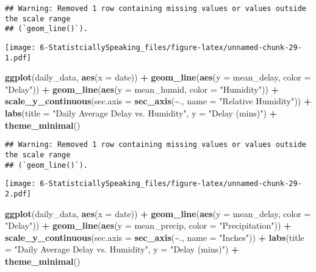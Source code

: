\documentclass[
]{article}
\newenvironment{Shaded}{\begin{snugshade}}{\end{snugshade}}
\newcommand{\AttributeTok}[1]{\textcolor[rgb]{0.13,0.29,0.53}{#1}}
\newcommand{\FunctionTok}[1]{\textcolor[rgb]{0.13,0.29,0.53}{\textbf{#1}}}
\newcommand{\NormalTok}[1]{#1}
\newcommand{\SpecialCharTok}[1]{\textcolor[rgb]{0.81,0.36,0.00}{\textbf{#1}}}
\newcommand{\StringTok}[1]{\textcolor[rgb]{0.31,0.60,0.02}{#1}}
\begin{document}
\begin{verbatim}
## Warning: Removed 1 row containing missing values or values outside the scale range
## (`geom_line()`).
\end{verbatim}

\texttt{[image: 6-StatistciallySpeaking\_files/figure-latex/unnamed-chunk-29-1.pdf]}

\begin{Shaded}
\begin{Highlighting}[]
\FunctionTok{ggplot}\NormalTok{(daily\_data, }\FunctionTok{aes}\NormalTok{(}\AttributeTok{x =}\NormalTok{ date)) }\SpecialCharTok{+}
  \FunctionTok{geom\_line}\NormalTok{(}\FunctionTok{aes}\NormalTok{(}\AttributeTok{y =}\NormalTok{ mean\_delay, }\AttributeTok{color =} \StringTok{"Delay"}\NormalTok{)) }\SpecialCharTok{+}
  \FunctionTok{geom\_line}\NormalTok{(}\FunctionTok{aes}\NormalTok{(}\AttributeTok{y =}\NormalTok{ mean\_humid, }\AttributeTok{color =} \StringTok{"Humidity"}\NormalTok{)) }\SpecialCharTok{+}
  \FunctionTok{scale\_y\_continuous}\NormalTok{(}\AttributeTok{sec.axis =} \FunctionTok{sec\_axis}\NormalTok{(}\SpecialCharTok{\textasciitilde{}}\NormalTok{., }\AttributeTok{name =} \StringTok{"Relative Humidity"}\NormalTok{)) }\SpecialCharTok{+}
  \FunctionTok{labs}\NormalTok{(}\AttributeTok{title =} \StringTok{"Daily Average Delay vs. Humidity"}\NormalTok{, }\AttributeTok{y =} \StringTok{"Delay (mins)"}\NormalTok{) }\SpecialCharTok{+}
  \FunctionTok{theme\_minimal}\NormalTok{()}
\end{Highlighting}
\end{Shaded}

\begin{verbatim}
## Warning: Removed 1 row containing missing values or values outside the scale range
## (`geom_line()`).
\end{verbatim}

\texttt{[image: 6-StatistciallySpeaking\_files/figure-latex/unnamed-chunk-29-2.pdf]}

\begin{Shaded}
\begin{Highlighting}[]
\FunctionTok{ggplot}\NormalTok{(daily\_data, }\FunctionTok{aes}\NormalTok{(}\AttributeTok{x =}\NormalTok{ date)) }\SpecialCharTok{+}
  \FunctionTok{geom\_line}\NormalTok{(}\FunctionTok{aes}\NormalTok{(}\AttributeTok{y =}\NormalTok{ mean\_delay, }\AttributeTok{color =} \StringTok{"Delay"}\NormalTok{)) }\SpecialCharTok{+}
  \FunctionTok{geom\_line}\NormalTok{(}\FunctionTok{aes}\NormalTok{(}\AttributeTok{y =}\NormalTok{ mean\_precip, }\AttributeTok{color =} \StringTok{"Precipitation"}\NormalTok{)) }\SpecialCharTok{+}
  \FunctionTok{scale\_y\_continuous}\NormalTok{(}\AttributeTok{sec.axis =} \FunctionTok{sec\_axis}\NormalTok{(}\SpecialCharTok{\textasciitilde{}}\NormalTok{., }\AttributeTok{name =} \StringTok{"Inches"}\NormalTok{)) }\SpecialCharTok{+}
  \FunctionTok{labs}\NormalTok{(}\AttributeTok{title =} \StringTok{"Daily Average Delay vs. Humidity"}\NormalTok{, }\AttributeTok{y =} \StringTok{"Delay (mins)"}\NormalTok{) }\SpecialCharTok{+}
  \FunctionTok{theme\_minimal}\NormalTok{()}
\end{Highlighting}
\end{Shaded}
\end{document}
